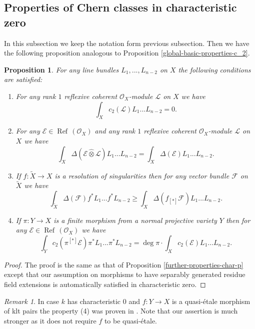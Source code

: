 \documentclass[twoside, 11pt]{article}
\theoremstyle{plain}
\newtheorem{Proposition}[Thm]{\sc Proposition}
\theoremstyle{definition}
\theoremstyle{remark}
\newtheorem{Remark}[Thm]{Remark}
\newcommand{\cE}{{\mathcal E}}
\newcommand{\cF}{{\mathcal F}}
\newcommand{\cL}{{\mathcal L}}
\newcommand{\cO}{{\mathcal O}}
\newcommand{\Refl}{{\mathop{\operatorname{Ref}\, }}}
\begin{document}
\subsection{Properties of  Chern classes in characteristic zero}

In this subsection we keep the notation form previous subsection. Then we have the following proposition analogous to Proposition \ref{global-basic-properties-c_2}.



\begin{Proposition}\label{further-properties}
For any  line bundles $L_1,..., L_{n-2}$ on $X$ the following conditions are satisfied:
\begin{enumerate}
\item For any rank $1$ reflexive coherent $\cO_X$-module $\cL$ on $X$ we have $$\int _X c_2 (\cL)L_1...L_{n-2}=0.$$
\item For any $\cE\in \Refl(\cO_X) $  and any rank $1$ reflexive coherent $\cO_X$-module $\cL$ on $X$ we have
$$ \int_X \Delta (\cE \hat \otimes \cL)L_1...L_{n-2}=\int_X \Delta (\cE) L_1...L_{n-2}.$$
\item If $f: \tilde X\to X$ is a resolution of singularities then for any vector bundle $\cF$ on $\tilde X$ we have
$$\int_{\tilde X} \Delta ( \cF)f^*L_1...f^*L_{n-2} \ge  \int_{X} \Delta ( f_{[*]}\cF) L_1...L_{n-2}. $$\item If  $ \pi: Y\to X$ is a finite morphism from a normal  projective variety $Y$ then for any $\cE\in \Refl(\cO_X) $ we have
$$\int_Yc_2 ( \pi ^{[*]}\cE) \pi^*L_1...\pi^*L_{n-2}= \deg \pi \cdot \int_Xc_2(\cE)L_1...L_{n-2}.$$
\end{enumerate}
\end{Proposition}

\begin{proof}
The proof is the same as that of Proposition \ref{further-properties-char-p} except that our assumption on 
morphisms to have separably generated residue field extensions is automatically satisfied in characteristic zero.
\end{proof}

\medskip

\begin{Remark}
In case $k$ has characteristic $0$ and $f: Y\to X$ is a quasi-\'etale morphism of klt pairs the property (4) was proven in 
\cite[Lemma 3.16]{GKPT}. Note that our assertion is much stronger as it does not require $f$ to be quasi-\'etale.
\end{Remark}
\end{document}
